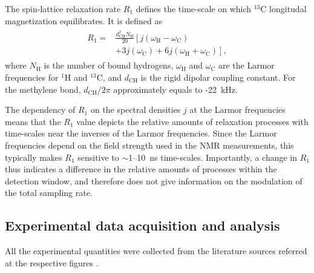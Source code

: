 \documentclass[journal=jpcbfk,manuscript=article,layout=twocolumn]{achemso}
\begin{document}
The spin-lattice relaxation rate $R_1$ defines the time-scale on which $^{13}$C longitudal magnetization equilibrates. It is defined as  
\begin{align}
\label{eq:R1}
\begin{split}
R_{1}=&\frac{d^2_{\mathrm{CH}}N_{\mathrm{H}}}{20}\left[j(\omega_{\mathrm{H}}-\omega_{\mathrm{C}})\right. \\
&\left.+3j(\omega_{\mathrm{C}})+6j(\omega_{\mathrm{H}}+\omega_{\mathrm{C}})\right] ,
\end{split}
\end{align}
where $N_{\mathrm{H}}$ is the number of bound hydrogens, $\omega_{\mathrm{H}}$ and $\omega_{\mathrm{C}}$ are the Larmor frequencies for $^{1}$H and $^{13}$C, and $d_{\mathrm{CH}}$ is the rigid dipolar coupling constant. For the methylene bond, $d_{\mathrm{CH}}/2\pi$ approximately equals to -22~kHz.


The dependency of $R_{1}$ on the spectral densities $j$ at the Larmor frequencies means that the $R_{1}$ value depicts the relative amounts of relaxation processes with time-scales near the inverses of the Larmor frequencies. Since the Larmor frequencies depend on the field strength used in the NMR measurements, this typically makes $R_{1}$ sensitive to $\sim$1--10~ns time-scales. Importantly, a change in $R_{1}$ thus indicates a difference in the relative amounts of processes within the detection window, and therefore does not give information on the modulation of the total sampling rate.  

\subsection{Experimental data acquisition and analysis}
%
All the experimental quantities were collected from the literature  sources referred at the respective figures .   
\end{document}
